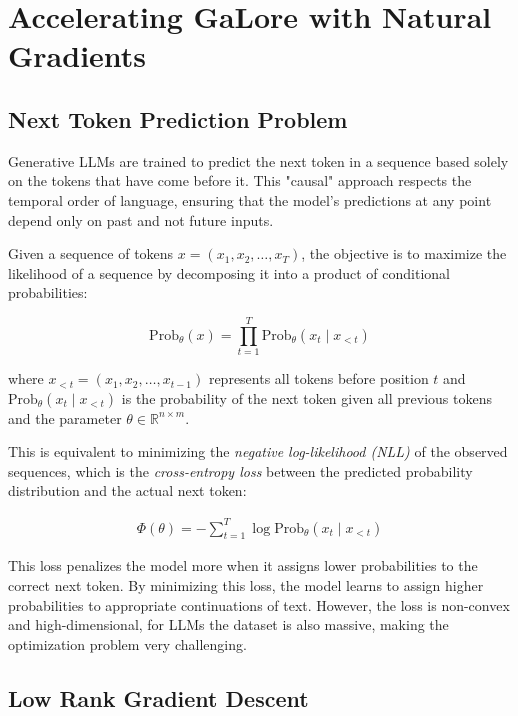\section{Accelerating GaLore with Natural Gradients}

\subsection{Next Token Prediction Problem}

Generative LLMs are trained to predict the next token in a sequence based solely on the tokens that have come before it. This "causal" approach respects the temporal order of language, ensuring that the model's predictions at any point depend only on past and not future inputs.

Given a sequence of tokens \( x = (x_1, x_2, \dots, x_T) \), the objective is to maximize the likelihood of a sequence by decomposing it into a product of conditional probabilities:

\[
\text{Prob}_{\theta}(x) = \prod_{t=1}^T \text{Prob}_{\theta}(x_t \mid x_{<t})
\]

where \( x_{<t} = (x_1, x_2, \dots, x_{t-1}) \) represents all tokens before position \( t \) and \( \text{Prob}_{\theta}(x_t \mid x_{<t}) \) is the probability of the next token given all previous tokens and the parameter \( \theta \in \mathbb{R}^{n \times m} \).

This is equivalent to minimizing the \textit{negative log-likelihood (NLL)} of the observed sequences, which is the \textit{cross-entropy loss} between the predicted probability distribution and the actual next token:

\begin{eqnarray}
\Phi(\theta) = -\sum_{t=1}^T \log \text{Prob}_{\theta}(x_t \mid x_{<t})
\label{eq:cross_entropy_loss}
\end{eqnarray}

This loss penalizes the model more when it assigns lower probabilities to the correct next token. By minimizing this loss, the model learns to assign higher probabilities to appropriate continuations of text. However, the loss is non-convex and high-dimensional, for LLMs the dataset is also massive, making the optimization problem very challenging.

\subsection{Low Rank Gradient Descent}

